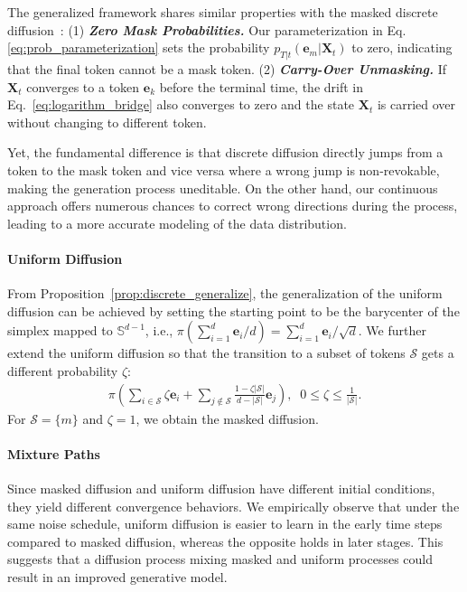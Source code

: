 The generalized framework shares similar properties with the masked discrete diffusion~\citep{sahoo2024simple}: (1) \textbf{\textit{Zero Mask Probabilities.}} Our parameterization in Eq.\eqref{eq:prob_parameterization} sets the probability $p_{T|t}(\bm{e}_m|\bm{X}_t)$ to zero, indicating that the final token cannot be a mask token.
(2) \textbf{\textit{Carry-Over Unmasking.}} If $\bm{X}_t$ converges to a token $\bm{e}_k$ before the terminal time, the drift in Eq.~\eqref{eq:logarithm_bridge} also converges to zero and the state $\bm{X}_t$ is carried over without changing to different token.


Yet, the fundamental difference is that discrete diffusion directly jumps from a token to the mask token and vice versa where a wrong jump is non-revokable, making the generation process uneditable.
On the other hand, our continuous approach offers numerous chances to correct wrong directions during the process, leading to a more accurate modeling of the data distribution.


\paragraph{Uniform Diffusion}
From Proposition~\ref{prop:discrete_generalize}, the generalization of the uniform diffusion can be achieved by setting the starting point to be the barycenter of the simplex mapped to $\mathbb{S}^{d-1}$, i.e., $\pi\left( \sum^d_{i=1} \bm{e}_i/d \right) = \sum^d_{i=1} \bm{e}_i / \sqrt{d}$. 
We further extend the uniform diffusion so that the transition to a subset of tokens $\mathcal{S}$ gets a different probability $\zeta$:
\begin{align}
    \pi\left( \sum_{i\in\mathcal{S}} \zeta \bm{e}_i + \sum_{j\notin\mathcal{S}} \frac{1 - \zeta|\mathcal{S}|}{d - |\mathcal{S}|}\bm{e}_j \right), \;\; 0\leq \zeta\leq \frac{1}{|\mathcal{S}|}.
\end{align}
For $\mathcal{S}=\{m\}$ and $\zeta=1$, we obtain the masked diffusion.


\paragraph{Mixture Paths}
Since masked diffusion and uniform diffusion have different initial conditions, they yield different convergence behaviors.
We empirically observe that under the same noise schedule, uniform diffusion is easier to learn in the early time steps compared to masked diffusion, whereas the opposite holds in later stages.
This suggests that a diffusion process mixing masked and uniform processes could result in an improved generative model.


